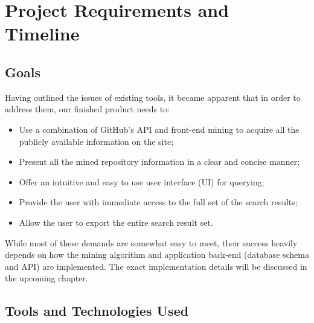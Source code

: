 \chapter{Project Requirements and Timeline}\label{ch:3}

\section{Goals}

Having outlined the issues of existing tools, it became apparent that in order to address them, our finished product needs to:

\begin{itemize}
    \item Use a combination of GitHub's API and front-end mining to acquire all the publicly available information on the site;
    \item Present all the mined repository information in a clear and concise manner;
    \item Offer an intuitive and easy to use user interface (UI) for querying;
    \item Provide the user with immediate access to the full set of the search results;
    \item Allow the user to export the entire search result set.
\end{itemize}

While most of these demands are somewhat easy to meet, their success heavily depends on how the mining algorithm and application back-end (database schema and API) are implemented.
The exact implementation details will be discussed in the upcoming chapter.

\section{Tools and Technologies Used}

